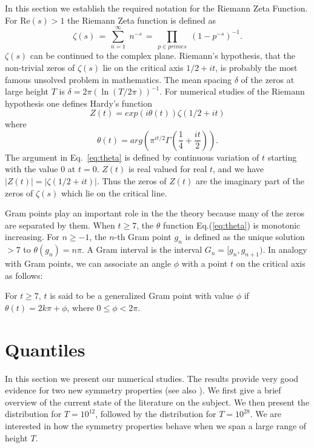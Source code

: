 \documentclass[twoside]{article}
\begin{document}
In this section we  establish the required notation for the 
Riemann Zeta Function. 
For $\mathrm{Re} (s) > 1$ the Riemann Zeta function is defined as
\begin{equation}
\zeta ( s ) \, = \, \sum^{\infty}_{n = 1} \; n^{-s} \, = \, \prod_{p \in primes} \;
\left( 1 - p^{-s} \right)^{-1}.
\label{eqRie}
\end{equation}
 $\zeta ( s )$ can be continued to
the complex plane. Riemann's hypothesis, that the non-trivial zeros of $\zeta ( s )$ lie on the 
critical axis $1/2+it$, is probably the most famous unsolved problem in mathematics.
The mean spacing $\delta$ of the zeros  at large height $T$ is $\delta = 2\pi(\ln (T/2\pi))^{-1}$. 
For numerical studies of the Riemann hypothesis one defines Hardy's function
\begin{equation}
Z(t)=exp(i\theta(t))\zeta(1/2 +it) 
\label{eq:hardy}
\end{equation}
where 
\begin{equation}
\theta(t) = arg (\pi^{it/2} \Gamma(\frac{1}{4} + \frac{it}{2})). 
\label{eq:theta}
\end{equation}
The argument in Eq.~\ref{eq:theta} is defined by continuous variation of $t$ starting with the value $0$ at $t = 0$.
$Z(t)$ is real valued for real $t$,
and we have $|Z(t)| = |\zeta(1/2+it)|$. Thus the zeros of $Z(t)$ are the imaginary part of the zeros 
of $\zeta(s)$ which lie on the critical line.  

Gram points play an important role in the the theory because many of the zeros are separated by them.  When $t \ge 7$, the $\theta$ function Eq.(\ref{eq:theta}) is monotonic increasing. 
For $n \ge -1$, the $n$-th Gram point $g_n$ is defined as the unique solution $> 7$ to
$\theta (g_n) = n\pi$. A Gram interval is the interval $G_n = [g_n,g_{n+1})$.
 In analogy with Gram points, we can associate an angle $\phi$ with a point $t$ on the critical axis as follows:
\begin{definition}\label{phi}
For $t \ge 7$, $t$ is said to be a generalized Gram point with value $\phi$  if
$\theta (t) = 2k\pi + \phi$, where $0 \le \phi < 2\pi$.
\end{definition}


\section{\label{sec3}Quantiles}
In this section we present our numerical studies. The results provide very good evidence for two new symmetry properties (see also \cite{Shanker 2018b}).
We first give a brief overview of the current state of the literature on the subject. We then present the distribution for $T=10^{12}$, followed by the distribution for $T=10^{28}$. We are interested in how the symmetry properties behave when we span a large range of height $T$.
\end{document}
